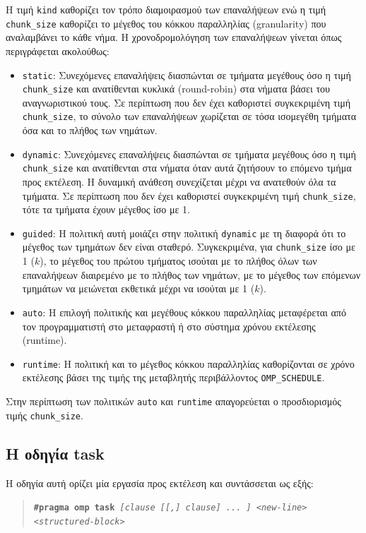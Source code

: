 Η τιμή \texttt{kind} καθορίζει τον τρόπο διαμοιρασμού των επαναλήψεων ενώ η τιμή \texttt{chunk\_size} καθορίζει το μέγεθος του κόκκου παραλληλίας (granularity) που αναλαμβάνει το κάθε νήμα. Η χρονοδρομολόγηση των επαναλήψεων γίνεται όπως περιγράφεται ακολούθως:
\begin{itemize}
	\item \texttt{static}: Συνεχόμενες επαναλήψεις διασπώνται σε τμήματα μεγέθους όσο η τιμή \texttt{chunk\_size} και ανατίθενται κυκλικά (round-robin) στα νήματα βάσει του αναγνωριστικού τους. Σε περίπτωση που δεν έχει καθοριστεί συγκεκριμένη τιμή \texttt{chunk\_size}, το σύνολο των επαναλήψεων χωρίζεται σε τόσα ισομεγέθη τμήματα όσα και το πλήθος των νημάτων.
	\item \texttt{dynamic}: Συνεχόμενες επαναλήψεις διασπώνται σε τμήματα μεγέθους όσο η τιμή \texttt{chunk\_size} και ανατίθενται στα νήματα όταν αυτά ζητήσουν το επόμενο τμήμα προς εκτέλεση. Η δυναμική ανάθεση συνεχίζεται μέχρι να ανατεθούν όλα τα τμήματα. Σε περίπτωση που δεν έχει καθοριστεί συγκεκριμένη τιμή \texttt{chunk\_size}, τότε τα τμήματα έχουν μέγεθος ίσο με 1.
	\item \texttt{guided}: Η πολιτική αυτή μοιάζει στην πολιτική \texttt{dynamic} με τη διαφορά ότι το μέγεθος των τμημάτων δεν είναι σταθερό. Συγκεκριμένα, για \texttt{chunk\_size} ίσο με 1 ($k$), το μέγεθος του πρώτου τμήματος ισούται με το πλήθος όλων των επαναλήψεων διαιρεμένο με το πλήθος των νημάτων, με το μέγεθος των επόμενων τμημάτων να μειώνεται εκθετικά μέχρι να ισούται με 1 ($k$).
	\item \texttt{auto}: Η επιλογή πολιτικής και μεγέθους κόκκου παραλληλίας μεταφέρεται από τον προγραμματιστή στο μεταφραστή ή στο σύστημα χρόνου εκτέλεσης (runtime).
	\item \texttt{runtime}: Η πολιτική και το μέγεθος κόκκου παραλληλίας καθορίζονται σε χρόνο εκτέλεσης βάσει της τιμής της μεταβλητής περιβάλλοντος \texttt{OMP\_SCHEDULE}.
\end{itemize}

Στην περίπτωση των πολιτικών \texttt{auto} και \texttt{runtime} απαγορεύεται ο προσδιορισμός τιμής \texttt{chunk\_size}.

\subsection{Η οδηγία task}
\label{ssec:task directive}
Η οδηγία αυτή ορίζει μία εργασία προς εκτέλεση και συντάσσεται ως εξής:
\begin{quote}
	\texttt{\textbf{\#pragma omp task} \textit{[clause [[,] clause] ... ] <new-line>}} \\
		\texttt{\textit{<structured-block>}}
\end{quote}

